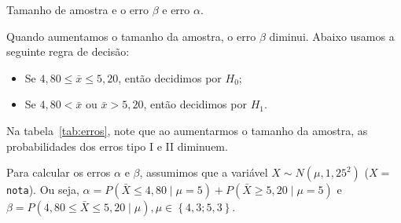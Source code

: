 \documentclass[8pt]{beamer}
\begin{document}
\begin{frame}{Tamanho de amostra e o erro $\beta$ e erro $\alpha$.}

\normalsize
	Quando aumentamos o tamanho da amostra, o erro $\beta$ 	diminui. Abaixo usamos a seguinte regra de decisão:
	\begin{itemize}
		\item Se $4,80 \leq \bar{x} \leq 5,20$, então decidimos por $H_0$;
		\item Se $4,80 < \bar{x}$ ou $ \bar{x} > 5,20$, então decidimos por $H_1$.
	\end{itemize}
	Na tabela~\ref{tab:erros}, note que ao aumentarmos o tamanho da amostra, as probabilidades dos erros tipo I e II diminuem. 
	
	\begin{table}[htbp]
		\caption{Erro $\alpha$ e $\beta$ ao aumentarmos o tamanho da amostra.}
		\label{tab:erros}
	\end{table}
\vfill

Para calcular os erros $\alpha$ e $\beta$, assumimos que a variável $X\sim N(\mu, 1,25^2)$ ($X = $ \texttt{nota}). Ou seja, $\alpha = P(\bar{X} \leq 4,80 \mid \mu = 5) + P(\bar{X} \geq 5,20 \mid \mu = 5)$ e $\beta = P\left( 4,80 \leq \bar{X} \leq 5,20 \mid \mu \right), \mu \in \left\{4,3; 5,3 \right\}$.	

\normalsize

\end{frame}
\end{document}
